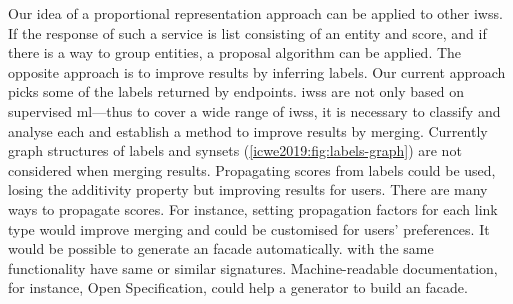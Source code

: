 Our idea of a proportional representation approach can be applied to other \glspl{iws}.
If the response of such a service is list consisting of an entity and score, and if there is a way to group entities, a proposal algorithm can be applied.
The opposite approach is to improve results by inferring labels.
Our current approach picks some of the labels returned by endpoints.
\Glspl{iws} are not only based on supervised \gls{ml}---thus to cover a wide range of \glspl{iws}, it is necessary to classify and analyse each  and establish a method to improve results by merging.
Currently graph structures of labels and synsets (\cref{icwe2019:fig:labels-graph}) are not considered when merging results.
Propagating scores from labels could be used, losing the additivity property but improving results for users.
There are many ways to propagate scores.
For instance, setting propagation factors for each link type would improve merging and could be customised for users' preferences.
It would be possible to generate an  facade automatically.
 with the same functionality have same or similar signatures.
Machine-readable  documentation, for instance, Open Specification, could help a generator to build an  facade.

